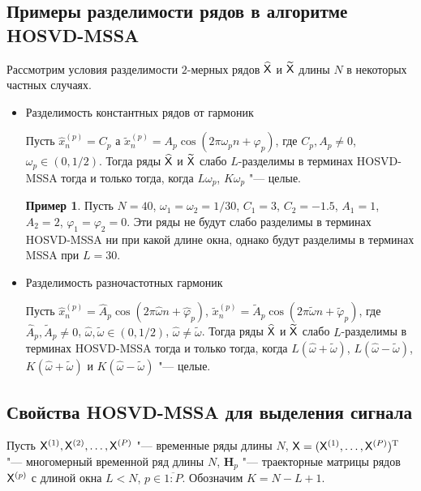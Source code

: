 \documentclass[specialist,
    substylefile = spbu_report.rtx,
    subf,href,colorlinks=true, 12pt]{disser}
\theoremstyle{plain}
\theoremstyle{definition}
\newtheorem{example}{Пример}[section]
\theoremstyle{remark}
\begin{document}
    \subsection{Примеры разделимости рядов в алгоритме HOSVD-MSSA}\label{subsec:hosvd-mssa-sep-example}
    Рассмотрим условия разделимости $2$-мерных рядов $\widehat{\mathsf{X}}$ и $\widetilde{\mathsf{X}}$ длины $N$ в некоторых
    частных случаях.
    \begin{itemize}
        \item Разделимость константных рядов от гармоник
        
        Пусть $\hat{x}_n^{(p)} = C_p$ а
        $\tilde{x}_n^{(p)} = A_p \cos(2\pi \omega_p n + \varphi_p)$,
        где $C_p, A_p \ne 0$, $\omega_p \in (0, 1/2)$.
        Тогда ряды $\widehat{\mathsf{X}}$ и $\widetilde{\mathsf{X}}$ слабо $L$-разделимы в терминах HOSVD-MSSA тогда и только тогда,
        когда $L\omega_p$, $K\omega_p$ "--- целые.
        \begin{example}
            Пусть $N=40$, $\omega_1=\omega_2=1/30$, $C_1 = 3$, $C_2=-1.5$, $A_1 = 1$, $A_2 = 2$, 
            $\varphi_1 = \varphi_2 = 0$. 
            Эти ряды не будут слабо разделимы в терминах HOSVD-MSSA ни при какой длине окна, однако 
            будут разделимы в терминах MSSA при $L=30$.
        \end{example}
        
        \item Разделимость разночастотных гармоник
        
        Пусть $\hat{x}_n^{(p)} = \widehat{A}_p \cos(2 \pi \hat{\omega} n + \hat{\varphi}_p)$,
        $\tilde{x}_n^{(p)} = \widetilde{A}_p \cos(2\pi \tilde{\omega} n + \tilde{\varphi}_p)$,
        где $\widehat{A}_p, \widetilde{A}_p \ne 0$, \linebreak $\hat{\omega}, \tilde{\omega} \in (0, 1/2)$, 
        $\hat{\omega} \ne \tilde{\omega}$.
        Тогда ряды $\widehat{\mathsf{X}}$ и $\widetilde{\mathsf{X}}$ слабо $L$-разделимы в терминах HOSVD-MSSA тогда и только тогда,
        когда $L(\hat{\omega} + \tilde{\omega})$, $L(\hat{\omega} - \tilde{\omega})$, 
        $K(\hat{\omega} + \tilde{\omega})$ и $K(\hat{\omega} - \tilde{\omega})$ "--- целые.
    \end{itemize}
    
    
    \subsection{Свойства HOSVD-MSSA для выделения сигнала}\label{subsec:hosvd-mssa-signal-properties}
    Пусть $\mathsf{X}^{(1)}, \mathsf{X}^{(2)}, \ldots, \mathsf{X}^{(P)}$ "--- временные ряды длины $N$,
    $\mathsf{X} = (\mathsf{X}^{(1)},\ldots, \mathsf{X}^{(P)})^{\mathrm{T}}$ "--- многомерный временной ряд длины $N$,
    $\mathbf{H}_p$ "--- траекторные матрицы рядов $\mathsf{X}^{(p)}$ с длиной окна $L < N$, $p\in \overline{1:P}$.
    Обозначим $K = N - L + 1$.
\end{document}
